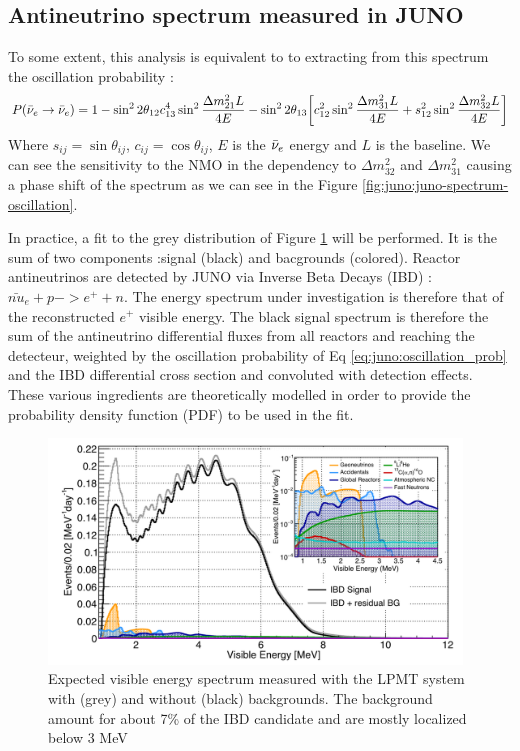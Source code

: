 \documentclass[../main.tex]{subfiles}
\begin{document}
\subsection{Antineutrino spectrum measured in JUNO}
\label{sec:juno:nom_precise_measurement}
To some extent, this analysis is equivalent to to extracting from this spectrum the oscillation probability \cite{an_neutrino_2016} :
\begin{equation*}
  \label{eq:juno:oscillation_prob}
  P(\bar{\nu}_{e} \rightarrow \bar{\nu}_{e}) = 1 - \sin^2 2\theta_{12} c^4_{13} \sin^2 \frac{\Delta m^2_{21}L}{4E} - \sin^2 2\theta_{13} \bigg[ c_{12}^2 \sin^2 \frac{\Delta m_{31}^2 L}{4E} + s^2_{12} \sin^2 \frac{\Delta m_{32}^2 L}{4E} \bigg]
\end{equation*}
Where $s_{ij} = \sin \theta_{ij}$, $c_{ij} = \cos \theta_{ij}$, $E$ is the $\bar{\nu}_{e}$ energy and $L$ is the baseline.
We can see the sensitivity to the NMO in the dependency to $\Delta m_{32}^2$ and $\Delta m^2_{31}$ causing a phase shift of the spectrum as we can see in the Figure \ref{fig:juno:juno-spectrum-oscillation}.

In practice, a fit to the grey distribution of Figure \ref{fig:juno:spectrum_with_background} will be performed. It is the sum of two components :signal (black) and bacgrounds (colored). Reactor antineutrinos are detected by JUNO via Inverse Beta Decays (IBD) : $\bar{nu}_e + p -> e^{+} + n$.
The energy spectrum under investigation is therefore that of the reconstructed $e^+$ visible energy. The black signal spectrum is therefore the sum of the antineutrino differential fluxes from all reactors and reaching the detecteur, weighted by the oscillation probability of Eq \ref{eq:juno:oscillation_prob} and the IBD differential cross section and convoluted with detection effects.
These various ingredients are theoretically modelled in order to provide the probability density function (PDF) to be used in the fit.

\begin{figure}[ht]
  \centering
  \includegraphics[height=6cm]{images/juno/spectrum_with_background.png}
  \caption{Expected visible energy spectrum measured with the LPMT system with (grey) and without (black) backgrounds. The background amount for about 7\% of the IBD candidate and are mostly localized below 3 MeV \cite{juno_collaboration_sub-percent_2022}}
  \label{fig:juno:spectrum_with_background}
\end{figure}
\end{document}
